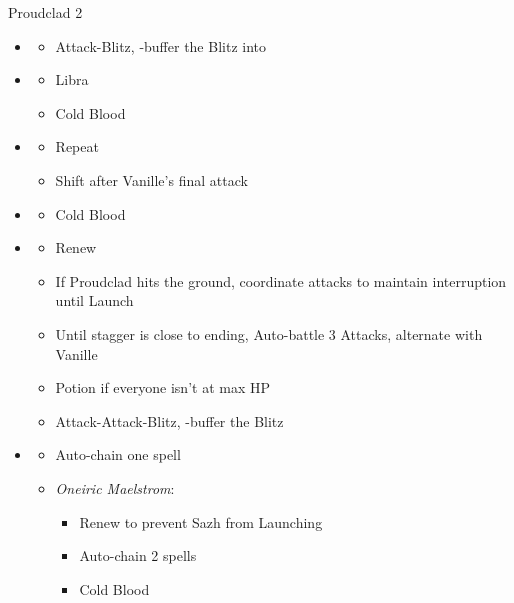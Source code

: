 \begin{battle}{Proudclad 2}
\begin{multicols}{2}
\begin{itemize}
    \item \second
    \begin{itemize}
        \item Attack-Blitz, \rav-buffer the Blitz into
    \end{itemize}
    \item \sixth
    \begin{itemize}
        \item Libra
        \item Cold Blood
    \end{itemize}
    \item \fifth
    \begin{itemize}
        \item Repeat
        \item Shift after Vanille's final attack
    \end{itemize}
    \item \first
    \begin{itemize}
        \item Cold Blood
    \end{itemize}
    \item \second
    \begin{itemize}
        \item Renew
        \item If Proudclad hits the ground, coordinate attacks to maintain interruption until Launch
        \item Until stagger is close to ending, Auto-battle 3 Attacks, alternate with Vanille
        \item Potion if everyone isn't at max HP
        \item Attack-Attack-Blitz, \rav-buffer the Blitz
    \end{itemize}
    \item \third
    \begin{itemize}
        \item Auto-chain one spell
        \item \textit{Oneiric Maelstrom}:
        \begin{itemize}
            \item Renew to prevent Sazh from Launching
            \item Auto-chain 2 spells
            \item Cold Blood
        \end{itemize}

\end{itemize}
\end{itemize}
\end{multicols}
\end{battle}
